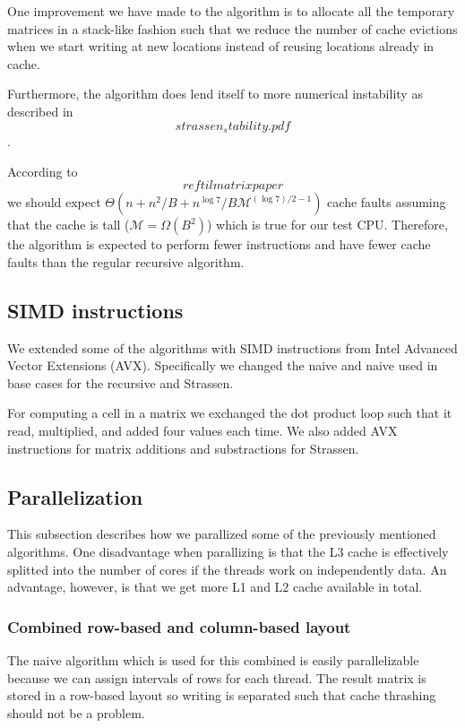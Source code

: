 One improvement we have made to the algorithm is to allocate all the temporary matrices in a stack-like fashion such that we reduce the number of cache evictions when we start writing at new locations instead of reusing locations already in cache.

Furthermore, the algorithm does lend itself to more numerical instability as described in \[strassen_stability.pdf\].

According to \[ ref til matrix paper \] we should expect $\Theta(n+n^2/B + n^{\log 7}/B\mathcal{M}^{(\log 7)/2-1})$ cache faults assuming that the cache is tall ($\mathcal{M} = \Omega(B^2)$) which is true for our test CPU. Therefore, the algorithm is expected to perform fewer instructions and have fewer cache faults than the regular recursive algorithm.

\subsection{SIMD instructions}

We extended some of the algorithms with SIMD instructions from Intel Advanced Vector Extensions (AVX). Specifically we changed the naive and naive used in base cases for the recursive and Strassen.

For computing a cell in a matrix we exchanged the dot product loop such that it read, multiplied, and added four values each time. We also added AVX instructions for matrix additions and substractions for Strassen.

\subsection{Parallelization}

This subsection describes how we parallized some of the previously mentioned algorithms. One disadvantage when parallizing is that the L3 cache is effectively splitted into the number of cores if the threads work on independently data. An advantage, however, is that we get more L1 and L2 cache available in total.


\subsubsection{Combined row-based and column-based layout}

The naive algorithm which is used for this combined is easily parallelizable because we can assign intervals of rows for each thread. The result matrix is stored in a row-based layout so writing is separated such that cache thrashing should not be a problem.

